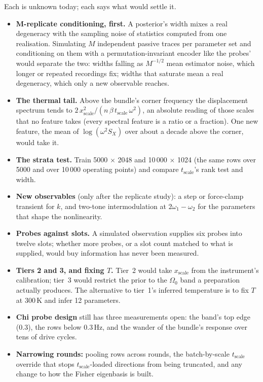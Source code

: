 \documentclass[10pt,a4paper]{article}
\newcommand{\tscale}{t_{\mathrm{scale}}}
\newcommand{\xscale}{x_{\mathrm{scale}}}
\begin{document}
Each is unknown today; each says what would settle it.
\begin{itemize}[leftmargin=1.4em,itemsep=1pt,topsep=2pt]
  \item \textbf{M-replicate conditioning, first.} A posterior's width mixes a real degeneracy with the sampling noise of
        statistics computed from one realisation. Simulating $M$ independent passive traces per parameter set and conditioning
        on them with a permutation-invariant encoder like the probes' would separate the two: widths falling as $M^{-1/2}$
        mean estimator noise, which longer or repeated recordings fix; widths that saturate mean a real degeneracy, which only a
        new observable reaches.
  \item \textbf{The thermal tail.} Above the bundle's corner frequency the displacement spectrum tends to
        $2\,\xscale^2/(n\,\beta\,\tscale\,\omega^2)$, an absolute reading of those scales that no feature takes (every spectral
        feature is a ratio or a fraction). One new feature, the mean of $\log(\omega^2 S_X)$ over about a decade above the
        corner, would take it.
  \item \textbf{The strata test.} Train 5000 $\times$ 2048 and 10\,000 $\times$ 1024 (the same rows over 5000 and over 10\,000
        operating points) and compare $\tscale$'s rank test and width.
  \item \textbf{New observables} (only after the replicate study): a step or force-clamp transient for $k$, and two-tone
        intermodulation at $2\omega_1-\omega_2$ for the parameters that shape the nonlinearity.
  \item \textbf{Probes against slots.} A simulated observation supplies six probes into twelve slots; whether more probes, or a
        slot count matched to what is supplied, would buy information has never been measured.
  \item \textbf{Tiers 2 and 3, and fixing $T$.} Tier~2 would take $\xscale$ from the instrument's calibration; tier~3 would
        restrict the prior to the $\Omega_0$ band a preparation actually produces. The alternative to tier~1's inferred
        temperature is to fix $T$ at 300\,K and infer 12 parameters.
  \item \textbf{Chi probe design} still has three measurements open: the band's top edge (0.3), the rows below 0.3\,Hz, and the
        wander of the bundle's response over tens of drive cycles.
  \item \textbf{Narrowing rounds:} pooling rows across rounds, the batch-by-scale $\tscale$ override that stops
        $\tscale$-loaded directions from being truncated, and any change to how the Fisher eigenbasis is built.
\end{itemize}
\end{document}
